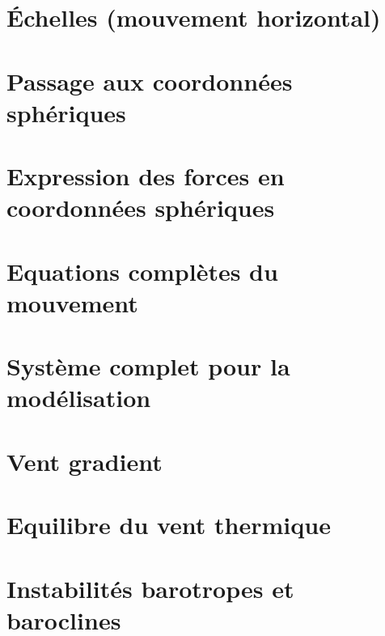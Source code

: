 \documentclass[a4paper,DIV16,10pt]{scrartcl}
\begin{document}
\newpage
\section{\'Echelles (mouvement horizontal)}


\newpage
\section{Passage aux coordonnées sphériques}


\newpage
\section{Expression des forces en coordonnées sphériques}


\newpage
\section{Equations complètes du mouvement}


\newpage
\section{Système complet pour la modélisation}


\newpage
\section{Vent gradient}


\newpage
\section{Equilibre du vent thermique}


\newpage
\section{Instabilités barotropes et baroclines}

\end{document}
